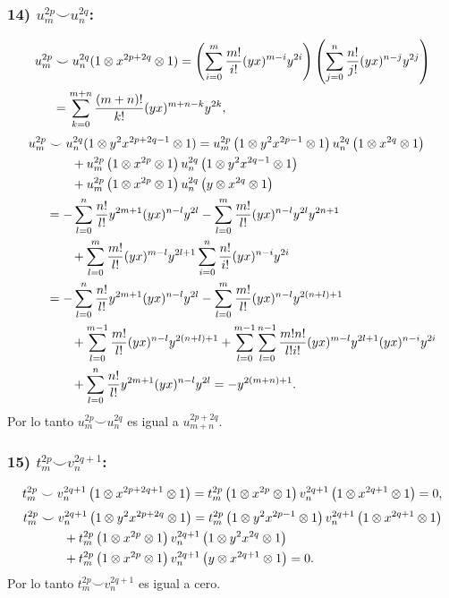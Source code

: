 \documentclass[fleqn,../tesis.tex]{subfiles}
\begin{document}
\subsubsection{14) $u_m^{2p} \smile u_n^{2q}$:}
\begin{align*}
	u_m^{2p} &\smile u_n^{2q}(1 \otimes x^{2p + 2q} \otimes 1) = \left(\sum_{i = 0}^{m}\frac{m!}{i!}(yx)^{m - i}y^{2i}\right)
			\left(\sum_{j = 0}^{n}\frac{n!}{j!}(yx)^{n - j}y^{2j}\right)\\
	&= \sum_{k = 0}^{m + n}\frac{(m + n)!}{k!}(yx)^{m + n - k}y^{2k},
\end{align*}
\begin{align*}
	u_m^{2p} &\smile u_n^{2q}(1 \otimes y^2x^{2p + 2q - 1} \otimes 1) = 
		u_m^{2p}\left(1\otimes y^2x^{2p - 1}\otimes 1\right)u_n^{2q}\left(1\otimes x^{2q}\otimes 1\right)\\
	&\qquad + u_m^{2p}\left(1 \otimes x^{2p} \otimes 1\right)u_n^{2q}\left(1\otimes y^2x^{2q - 1}\otimes 1\right)\\
	&\qquad + u_m^{2p}\left(1 \otimes x^{2p} \otimes 1\right)u_n^{2q}\left(y\otimes x^{2q}\otimes 1\right)\\
	&= -\sum_{l = 0}^{n}\frac{n!}{l!}y^{2m + 1}(yx)^{n - l}y^{2l}
		-\sum_{l = 0}^{m}\frac{m!}{l!}(yx)^{n - l}y^{2l}y^{2n + 1}\\
	&\qquad + \sum_{l = 0}^{m}\frac{m!}{l!}(yx)^{m - l}y^{2l + 1}\sum_{i = 0}^{n}\frac{n!}{i!}(yx)^{n - i}y^{2i}\\
	&= -\sum_{l = 0}^{n}\frac{n!}{l!}y^{2m + 1}(yx)^{n - l}y^{2l}
		-\sum_{l = 0}^{m}\frac{m!}{l!}(yx)^{n - l}y^{2(n + l) + 1}\\
	&\qquad +\sum_{l = 0}^{m- 1}\frac{m!}{l!}(yx)^{n - l}y^{2(n + l) + 1}
		+ \sum_{l = 0}^{m - 1}\sum_{l = 0}^{n -1}\frac{m!n!}{l!i!}(yx)^{m - l}y^{2l + 1}(yx)^{n - i}y^{2i}\\
	&\qquad + \sum_{l = 0}^{n}\frac{n!}{l!}y^{2m + 1}(yx)^{n - l}y^{2l} = -y^{2(m + n) + 1}.
\end{align*}
Por lo tanto $u_m^{2p} \smile u_n^{2q}$ es igual a $u_{m + n}^{2p + 2q}$.
\subsubsection{15) $t_m^{2p} \smile v_n^{2q + 1}$:}
\begin{align*}
	t_m^{2p}\smile v_n^{2q + 1}\left(1\otimes x^{2p + 2q + 1} \otimes 1\right)
		= t_m^{2p}\left(1\otimes x^{2p}\otimes 1\right)v_n^{2q + 1}\left(1\otimes x^{2q + 1}\otimes 1\right) = 0,
\end{align*}
\begin{align*}
	t_m^{2p} & \smile v_n^{2q + 1}\left(1\otimes y^2x^{2p + 2q} \otimes 1\right)
		= t_m^{2p}\left(1\otimes y^2x^{2p - 1}\otimes 1\right)v_n^{2q + 1}\left(1\otimes x^{2q + 1}\otimes 1\right)\\
	&\qquad + t_m^{2p}\left(1 \otimes x^{2p} \otimes 1\right)v_n^{2q + 1}\left(1\otimes y^2x^{2q}\otimes 1\right)\\
	&\qquad + t_m^{2p}\left(1 \otimes x^{2p} \otimes 1\right)v_n^{2q + 1}\left(y\otimes x^{2q +1}\otimes 1\right) = 0.
\end{align*}
Por lo tanto $t_m^{2p}\smile v_n^{2q + 1}$ es igual a cero.
\end{document}
